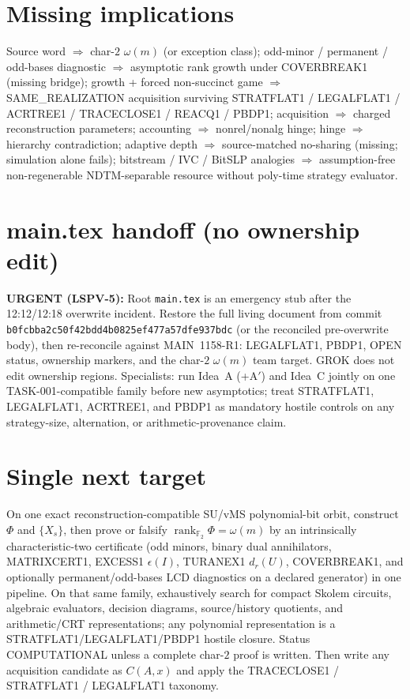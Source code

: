 \documentclass[11pt]{article}
\begin{document}
\section*{Missing implications}
Source word $\Rightarrow$ char-$2$ $\omega(m)$ (or exception class);
odd-minor / permanent / odd-bases diagnostic $\Rightarrow$ asymptotic rank growth under COVERBREAK1
(missing bridge);
growth + forced non-succinct game $\Rightarrow$ SAME\_REALIZATION acquisition surviving
STRATFLAT1 / LEGALFLAT1 / ACRTREE1 / TRACECLOSE1 / REACQ1 / PBDP1;
acquisition $\Rightarrow$ charged reconstruction parameters;
accounting $\Rightarrow$ nonrel/nonalg hinge;
hinge $\Rightarrow$ hierarchy contradiction;
adaptive depth $\Rightarrow$ source-matched no-sharing (missing; simulation alone fails);
bitstream / IVC / BitSLP analogies $\Rightarrow$ assumption-free non-regenerable NDTM-separable
resource without poly-time strategy evaluator.

\section*{main.tex handoff (no ownership edit)}
\textbf{URGENT (LSPV-5):} Root \texttt{main.tex} is an emergency stub after the 12:12/12:18
overwrite incident. Restore the full living document from commit
\texttt{b0fcbba2c50f42bdd4b0825ef477a57dfe937bdc} (or the reconciled pre-overwrite body),
then re-reconcile against MAIN~1158-R1: LEGALFLAT1, PBDP1, OPEN status, ownership markers,
and the char-$2$ $\omega(m)$ team target. GROK does not edit ownership regions.
Specialists: run Idea~A (+A$'$) and Idea~C jointly on one TASK-001-compatible family before
new asymptotics; treat STRATFLAT1, LEGALFLAT1, ACRTREE1, and PBDP1 as mandatory hostile
controls on any strategy-size, alternation, or arithmetic-provenance claim.

\section*{Single next target}
On one exact reconstruction-compatible SU/vMS polynomial-bit orbit, construct $\Phi$ and
$\{X_s\}$, then prove or falsify $\operatorname{rank}_{\mathbb F_2}\Phi=\omega(m)$ by an
intrinsically characteristic-two certificate (odd minors, binary dual annihilators,
MATRIXCERT1, EXCESS1 $\epsilon(I)$, TURANEX1 $d_r(U)$, COVERBREAK1, and optionally
permanent/odd-bases LCD diagnostics on a declared generator) in one pipeline.
On that same family, exhaustively search for compact Skolem circuits, algebraic evaluators,
decision diagrams, source/history quotients, and arithmetic/CRT representations; any
polynomial representation is a STRATFLAT1/LEGALFLAT1/PBDP1 hostile closure.
Status COMPUTATIONAL unless a complete char-$2$ proof is written. Then write any acquisition
candidate as $C(A,x)$ and apply the TRACECLOSE1 / STRATFLAT1 / LEGALFLAT1 taxonomy.
\end{document}
